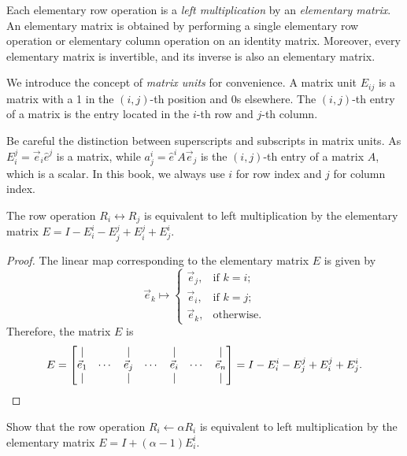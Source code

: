 Each elementary row operation is a \emph{left multiplication} by an \emph{elementary matrix}. An elementary matrix is obtained by performing a single elementary row operation or elementary column operation on an identity matrix. Moreover, every elementary matrix is invertible, and its inverse is also an elementary matrix.

We introduce the concept of \emph{matrix units} for convenience. A matrix unit $E_{ij}$ is a matrix with a 1 in the $(i, j)$-th position and 0s elsewhere. The $(i, j)$-th entry of a matrix is the entry located in the $i$-th row and $j$-th column.

\begin{remark}
  Be careful the distinction between superscripts and subscripts in matrix units. As $E_i^j = \vec{e}_i \hat{e}^j$ is a matrix, while $a_j^i = \hat{e}^i A \vec{e}_j$ is the $(i, j)$-th entry of a matrix $A$, which is a scalar. In this book, we always use $i$ for row index and $j$ for column index.
\end{remark}

\begin{proposition}
  The row operation $R_i \leftrightarrow R_j$ is equivalent to left multiplication by the elementary matrix $E = I - E_i^i - E_j^j + E_i^j + E_j^i$.
\end{proposition}
\begin{proof}
  The linear map corresponding to the elementary matrix $E$ is given by
  \[
    \vec{e}_k \mapsto \begin{cases}
      \vec{e}_j, & \text{if } k = i; \\
      \vec{e}_i, & \text{if } k = j; \\
      \vec{e}_k, & \text{otherwise}.
    \end{cases}
  \]
  Therefore, the matrix $E$ is
  \[
    E = \begin{bmatrix}
      |         &        & |           &        & |           &        & |         \\
      \vec{e}_1 & \cdots & \vec{e}_{j} & \cdots & \vec{e}_{i} & \cdots & \vec{e}_n \\
      |         &        & |           &        & |           &        & |
    \end{bmatrix} = I - E_i^i - E_j^j + E_i^j + E_j^i. \qedhere
  \]
\end{proof}

\begin{exercise}
  Show that the row operation $R_i \leftarrow \alpha R_i$ is equivalent to left multiplication by the elementary matrix $E = I + (\alpha - 1) E_i^i$.
\end{exercise}

